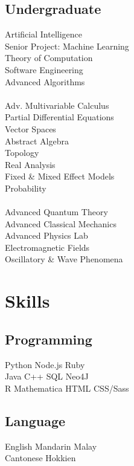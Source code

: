 \documentclass{deedy-resume-openfont}
\begin{document}
\begin{minipage}[t]{0.33\textwidth}
\subsection{Undergraduate}
Artificial Intelligence \\
Senior Project: Machine Learning \\
Theory of Computation \\
Software Engineering \\
Advanced Algorithms \\
\ \\
Adv. Multivariable Calculus \\
Partial Differential Equations \\
Vector Spaces \\
Abstract Algebra \\
Topology \\
Real Analysis \\
Fixed \& Mixed Effect Models \\
Probability \\
\ \\
Advanced Quantum Theory \\
Advanced Classical Mechanics \\
Advanced Physics Lab \\
Electromagnetic Fields \\
Oscillatory \& Wave Phenomena \\

\sectionsep


\section{Skills}
\subsection{Programming}
Python \textbullet{} Node.js \textbullet{} Ruby \\

Java \textbullet{} C++ \textbullet{} SQL \textbullet{} Neo4J \\
R \textbullet{} Mathematica \textbullet{} HTML \textbullet{} CSS/Sass \\
\sectionsep

\subsection{Language}
English \textbullet{} Mandarin \textbullet{} Malay \\
Cantonese \textbullet{} Hokkien
\sectionsep

%
%

\end{minipage}
\end{document}
